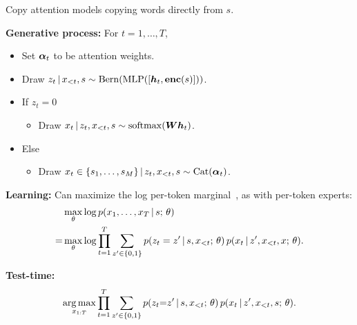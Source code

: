 \begin{frame}
Copy attention models copying words directly from $s$.
\air


\textbf{Generative process:} For $t=1, \ldots, T$,
\begin{itemize}
    \item Set $\boldsymbol{\alpha}_t$ to be attention weights.
    \item Draw $z_{t} \,|\, x_{< t}, s \sim \mathrm{Bern}(\operatorname*{MLP}([\boldsymbol{h}_{t}, \boldsymbol{\mathrm{enc}}(s)]))$.
    \item If $z_{t} = 0$
    \begin{itemize}
        \item Draw $x_{t} \,|\, z_{t}, x_{< t}, s \sim \operatorname*{softmax}(\boldsymbol{W} \boldsymbol{h}_{t})$.
    \end{itemize}
    \item Else 
    \begin{itemize}
        \item Draw $x_{t} \in \{s_1, \ldots, s_M\} \,|\, z_{t}, x_{< t}, s \sim \mathrm{Cat}(\boldsymbol{\alpha}_t)$.

    \end{itemize}
    \end{itemize}

\end{frame}

\begin{frame}
\textbf{Learning:} Can maximize the log per-token marginal~\citep{gu2016incorporating}, as with per-token experts:
        \begin{align*}
        &\max_{\theta} \log p(x_1, \ldots, x_T \,|\, s ; \, \theta) \\
        = &\max_{\theta} \log \prod_{t=1}^T \sum_{z' \in\{0, 1\}} p(z_t = z' \,|\, s, x_{<t} ; \, \theta) \, p(x_t \,|\, z', x_{<t}, x ; \, \theta).
    \end{align*}
    
    \air
    \air
\textbf{Test-time:}
\begin{align*}
\argmax_{x_{1:T}} \prod_{t=1}^T \sum_{z' \in\{0, 1\}} p(z_t {=} z' \given s, x_{<t} \param \theta) \, p(x_t \given z', x_{<t}, s \param \theta).
\end{align*}
\end{frame}

